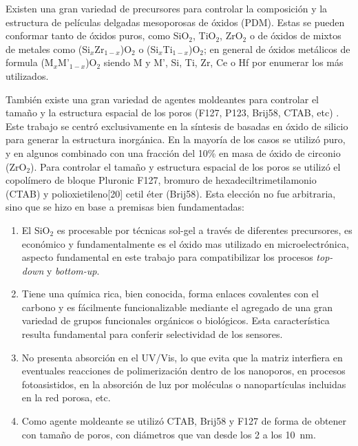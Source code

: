 	Existen una gran variedad de precursores para controlar la composición y la estructura de películas delgadas mesoporosas de óxidos (PDM). Estas se pueden conformar tanto de óxidos puros, como SiO$_2$, TiO$_2$, ZrO$_2$ o de óxidos de mixtos de metales como (Si$_x$Zr$_{1-x}$)O$_2$ o (Si$_x$Ti$_{1-x}$)O$_2$; en general de óxidos metálicos de formula (M$_{x}$M'$_{1-x}$)O$_2$ siendo M y M', Si, Ti, Zr, Ce o Hf por enumerar los más utilizados.

	También existe una gran variedad de agentes moldeantes para controlar el tamaño y la estructura espacial de los poros (F127, P123, Brij58, CTAB, etc) \cite{angelome2011,schuth2013,Soler-Illia2006,Soler-Illia2002a}. Este trabajo se centró exclusivamente en la síntesis de \pdm\space basadas en óxido de silicio para generar la estructura inorgánica. En la mayoría de los casos se utilizó puro, y en algunos combinado con una fracción del 10\% en masa de óxido de circonio (ZrO$_2$). Para controlar el tamaño y estructura espacial de los poros se utilizó el copolímero de bloque Pluronic F127, bromuro de hexadeciltrimetilamonio (CTAB) y polioxietileno[20] cetil éter (Brij58). Esta elección no fue arbitraria, sino que se hizo en base a premisas bien fundamentadas:
		
		\begin{enumerate}

		\item El SiO$_2$ es procesable por técnicas sol-gel a través de diferentes precursores, es económico y fundamentalmente es el óxido mas utilizado en microelectrónica, aspecto fundamental en este trabajo para compatibilizar los procesos \textit{top-down} y \textit{bottom-up}.

		\item Tiene una química rica, bien conocida, forma enlaces covalentes con el carbono y es fácilmente funcionalizable mediante el agregado de una gran variedad de grupos funcionales orgánicos o biológicos. Esta característica resulta fundamental para conferir selectividad de los sensores.

		\item No presenta absorción en el UV/Vis, lo que evita que la matriz interfiera en eventuales reacciones de polimerización dentro de los nanoporos, en procesos fotoasistidos, en la absorción de luz por moléculas o nanopartículas incluidas en la red porosa, etc. 

		\item Como agente moldeante se utilizó CTAB, Brij58 y F127  de forma de obtener \pdm\space con tamaño de poros, con diámetros que van desde los 2 a los \SI{10}{\nm}.

		\end{enumerate}
	
